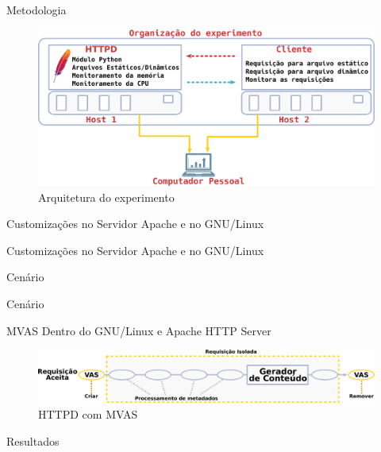 \documentclass[xcolor={usenames,svgnames,dvipsnames},brazil,english,12pt,aspectratio=149]{beamer}
\begin{document}
\begin{frame}{Metodologia}
	\begin{figure}[!h] \centering
		\includegraphics[width=.90\textwidth]{experiment_arhitecture}
		\caption{Arquitetura do experimento} \label{fig:experiment_architecture}
	\end{figure}
\end{frame}

\begin{frame}{Customizações no Servidor Apache e no GNU/Linux}
	
\end{frame}

\begin{frame}{Customizações no Servidor Apache e no GNU/Linux}
	
\end{frame}

\begin{frame}{Cenário}
	
\end{frame}

\begin{frame}{Cenário}
	
\end{frame}

\begin{frame}{MVAS Dentro do GNU/Linux e Apache HTTP Server}
	\begin{figure}[!h]
		\centering
		\includegraphics[width=\textwidth]{mvas_httpd}
		\caption{HTTPD com MVAS}
		\label{fig:httpd_mvas}
	\end{figure}
\end{frame}

\begin{frame}{Resultados}
	
\end{frame}
\end{document}
